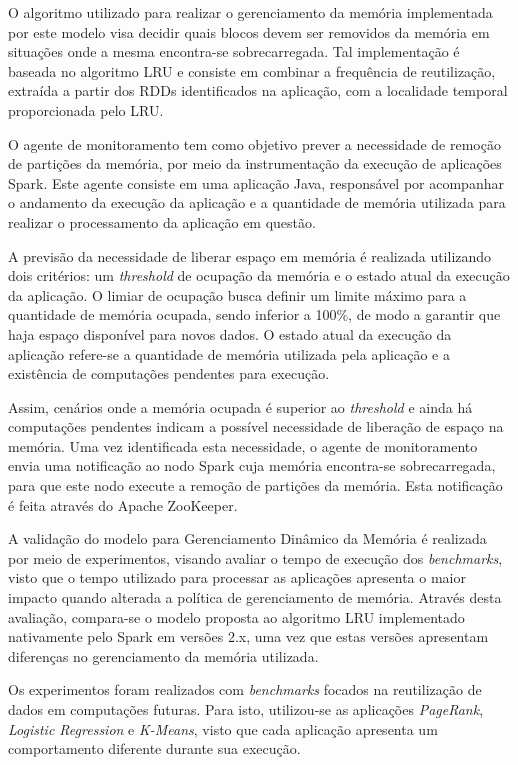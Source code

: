 O algoritmo utilizado para realizar o gerenciamento da memória implementada por este modelo visa decidir quais blocos devem ser removidos da memória em situações onde a mesma encontra-se sobrecarregada. Tal implementação é baseada no algoritmo LRU e consiste em combinar a frequência de reutilização, extraída a partir dos RDDs identificados na aplicação, com a localidade temporal proporcionada pelo LRU.

O agente de monitoramento tem como objetivo prever a necessidade de remoção de partições da memória, por meio da instrumentação da execução de aplicações Spark. Este agente consiste em uma aplicação Java, responsável por acompanhar o andamento da execução da aplicação e a quantidade de memória utilizada para realizar o processamento da aplicação em questão.

A previsão da necessidade de liberar espaço em memória é realizada utilizando dois critérios: um \textit{threshold} de ocupação da memória e o estado atual da execução da aplicação. O limiar de ocupação busca definir um limite máximo para a quantidade de memória ocupada, sendo inferior a 100\%, de modo a garantir que haja  espaço disponível para novos dados. O estado atual da execução da aplicação refere-se a quantidade de memória utilizada pela aplicação e a existência de computações pendentes para execução.

Assim, cenários onde a memória ocupada é superior ao \textit{threshold} e ainda há computações pendentes indicam a possível necessidade de liberação de espaço na memória. Uma vez identificada esta necessidade, o agente de monitoramento envia uma notificação ao nodo Spark cuja memória encontra-se sobrecarregada, para que este nodo execute a remoção de partições da memória. Esta notificação é feita através do Apache ZooKeeper.

A validação do modelo para Gerenciamento Dinâmico da Memória é realizada por meio de experimentos, visando avaliar o tempo de execução dos \textit{benchmarks}, visto que o tempo utilizado para processar as aplicações apresenta o maior impacto quando alterada a política de gerenciamento de memória. Através desta avaliação, compara-se o modelo proposta ao algoritmo LRU implementado nativamente pelo Spark em versões 2.x, uma vez que estas versões apresentam diferenças no gerenciamento da memória utilizada. 

Os experimentos foram realizados com \textit{benchmarks} focados na reutilização de dados em computações futuras. Para isto, utilizou-se as aplicações \textit{PageRank}, \textit{Logistic Regression} e \textit{K-Means}, visto que cada aplicação apresenta um comportamento diferente durante sua execução. 

